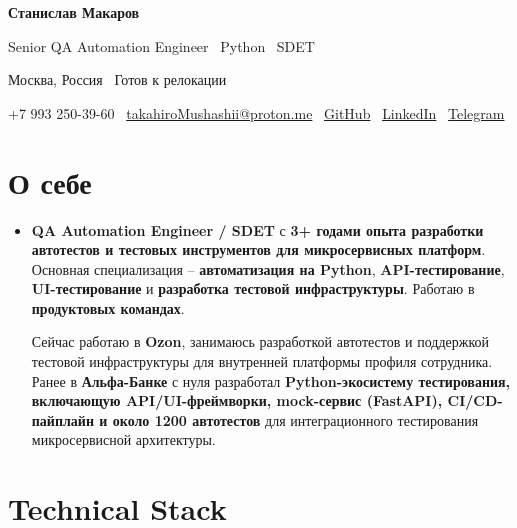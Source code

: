 \documentclass[letterpaper,11pt]{article}
\newcommand{\resumeSubHeadingListStart}{\begin{itemize}[leftmargin=0.15in, label={}]}
\newcommand{\resumeSubHeadingListEnd}{\end{itemize}}
\begin{document}

\begin{center}

{\Huge \textbf{Станислав Макаров}}

\vspace{4pt}

{\large Senior QA Automation Engineer \textbar\ Python \textbar\ SDET}

\vspace{4pt}

Москва, Россия \textbullet\ Готов к релокации

\vspace{6pt}

\small
+7 993 250-39-60 \textbar\
\href{mailto:takahiroMushashii@proton.me}{takahiroMushashii@proton.me}
\textbar\
\href{https://github.com/chyioIshi}{GitHub}
\textbar\
\href{https://linkedin.com/in/chyioIshi}{LinkedIn}
\textbar\
\href{https://t.me/makarovsvv}{Telegram}

\end{center}

\section{О себе}
    \resumeSubHeadingListStart
        \item{\textbf{QA Automation Engineer / SDET} с \textbf{3+ годами опыта разработки автотестов и тестовых инструментов для микросервисных платформ}.
        Основная специализация -- \textbf{автоматизация на Python}, \textbf{API-тестирование}, \textbf{UI-тестирование} и \textbf{разработка тестовой инфраструктуры}.
        Работаю в \textbf{продуктовых командах}.

        Сейчас работаю в \textbf{Ozon}, занимаюсь разработкой автотестов и поддержкой тестовой инфраструктуры для внутренней платформы профиля сотрудника.
        Ранее в \textbf{Альфа-Банке} с нуля разработал \textbf{Python-экосистему тестирования, включающую API/UI-фреймворки, mock-сервис (FastAPI), CI/CD-пайплайн
         и около 1200 автотестов} для интеграционного тестирования микросервисной архитектуры.}
    \resumeSubHeadingListEnd

\section{Technical Stack}
\end{document}
